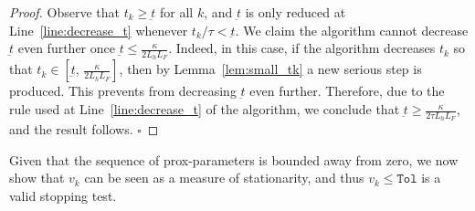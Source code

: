 \documentclass[smallextended,envcountsect]{svjour3}
\newcommand{\tol}{\texttt{Tol}}
\newcommand{\mybox}{{\hfill $\square$}}
\begin{document}
\begin{proof}
Observe that $t_k\geq \underbar{t}$ for all $k$, and $\underbar{t}$ is only reduced at Line~\ref{line:decrease_t} whenever $t_k/\tau < \underbar{t}$. %
We claim the algorithm cannot decrease $\underbar{t}$ even further once $\underbar{t}\leq \frac{\kappa}{2L_hL_F}$. Indeed, in this case, if the algorithm decreases $t_k$ so that $t_k \in [\underbar{t},\, \frac{\kappa}{2L_hL_F}]$, then by Lemma~\ref{lem:small_tk} a new serious step is produced. This prevents from decreasing $\underbar{t}$ even further.
Therefore, due to the rule used at Line~\ref{line:decrease_t} of the algorithm, we conclude that $\underbar{t}\geq \frac{\kappa}{2\tau L_hL_F}$, and the result follows.
\mybox
\end{proof}
Given that the sequence of prox-parameters is bounded away from zero, we now show that $v_k$ can be seen as a measure of stationarity, and thus $v_k\leq \tol$ is a valid stopping test.
\end{document}
